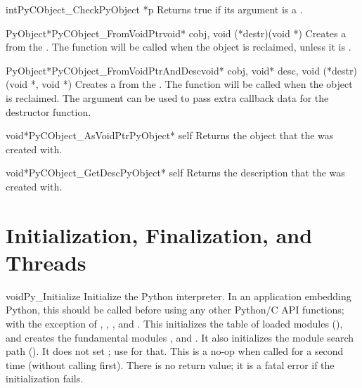 \documentclass{manual}
\begin{document}
\begin{cfuncdesc}{int}{PyCObject_Check}{PyObject *p}
Returns true if its argument is a .
\end{cfuncdesc}

\begin{cfuncdesc}{PyObject*}{PyCObject_FromVoidPtr}{void* cobj, 
	void (*destr)(void *)}
Creates a  from the .  The
 function will be called when the object is reclaimed, unless
it is \NULL.
\end{cfuncdesc}

\begin{cfuncdesc}{PyObject*}{PyCObject_FromVoidPtrAndDesc}{void* cobj,
	void* desc, void (*destr)(void *, void *) }
Creates a  from the .  The
 function will be called when the object is reclaimed.  The
 argument can be used to pass extra callback data for the
destructor function.
\end{cfuncdesc}

\begin{cfuncdesc}{void*}{PyCObject_AsVoidPtr}{PyObject* self}
Returns the object  that the
  was created with.
\end{cfuncdesc}

\begin{cfuncdesc}{void*}{PyCObject_GetDesc}{PyObject* self}
Returns the description  that the
  was created with.
\end{cfuncdesc}


\chapter{Initialization, Finalization, and Threads
         \label{initialization}}

\begin{cfuncdesc}{void}{Py_Initialize}{}
Initialize the Python interpreter.  In an application embedding 
Python, this should be called before using any other Python/C API 
functions; with the exception of
,
,
,
and .
This initializes the table of loaded modules (), and
creates the
fundamental modules ,
 and
.  It also initializes the module
search path ().
It does not set ; use
 for that.  This
is a no-op when called for a second time (without calling
 first).  There is no
return value; it is a fatal error if the initialization fails.
\end{cfuncdesc}
\end{document}
